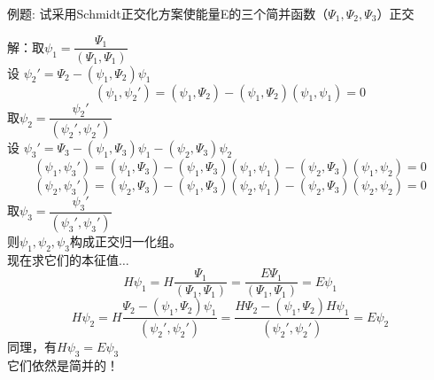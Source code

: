 \begin{frame} [allowframebreaks=]
    \frametitle{}
    \begin{tcolorbox2}{例题:}
       试采用Schmidt正交化方案使能量E的三个简并函数（$\Psi_1, \Psi_2, \Psi_3$）正交
     \end{tcolorbox2}
    \alert{解：}取$\psi_1=\dfrac{\Psi_1}{(\Psi_1, \Psi_1)}$\\
    设 $\psi_2'=\Psi_2-(\psi_1, \Psi_2)\psi_1$\\
    \begin{equation*}
        (\psi_1, \psi_2')=(\psi_1, \Psi_2)-(\psi_1, \Psi_2)(\psi_1, \psi_1)=0
    \end{equation*}  
    取$\psi_2=\dfrac{\psi_2'}{(\psi_2', \psi_2')}$\\
    设 $\psi_3'=\Psi_3-(\psi_1, \Psi_3)\psi_1-(\psi_2, \Psi_3)\psi_2$\\
    \begin{equation*}
        (\psi_1, \psi_3')=(\psi_1, \Psi_3)-(\psi_1, \Psi_3)(\psi_1, \psi_1)-(\psi_2, \Psi_3)(\psi_1, \psi_2)=0
    \end{equation*}
    \begin{equation*}
        (\psi_2, \psi_3')=(\psi_2, \Psi_3)-(\psi_1, \Psi_3)(\psi_2, \psi_1)-(\psi_2, \Psi_3)(\psi_2, \psi_2)=0
    \end{equation*}
    取$\psi_3=\dfrac{\psi_3'}{(\psi_3', \psi_3')}$\\
    则$\psi_1, \psi_2, \psi_3$构成正交归一化组。\\ \vspace{0.6em}
    现在求它们的本征值$\dots$\\
    $$ H\psi_1= H \dfrac{\Psi_1}{(\Psi_1, \Psi_1)} =  \dfrac{E\Psi_1}{(\Psi_1, \Psi_1)} = E \psi_1$$
    $$ H\psi_2= H \dfrac{\Psi_2-(\psi_1, \Psi_2)\psi_1}{(\psi_2', \psi_2')} =  \dfrac{H\Psi_2-(\psi_1, \Psi_2)H\psi_1}{(\psi_2', \psi_2')}=E\psi_2$$
    同理，有$ H\psi_3=E\psi_3$\\
    它们依然是简并的！
\end{frame} 

